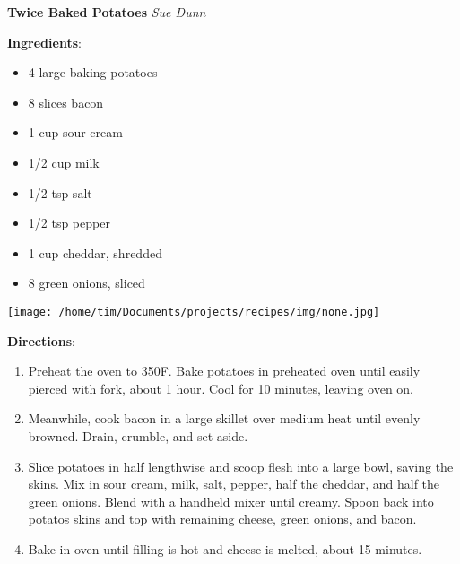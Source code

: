 \documentclass[11pt, twoside, openany]{book}
\begin{document}
\noindent\begin{minipage}[t]{\linewidth}%
{\Large\textbf{Twice Baked Potatoes}} \label{twice-baked-potatoes}\hfill\textit{Sue Dunn}\\
\noindent\begin{minipage}[t]{0.78\linewidth}%
\textbf{Ingredients}:\vspace{-3mm}
\begin{multicols}{2}
\begin{itemize}\setlength\itemsep{-1mm}
\item 4 large baking potatoes
\item 8 slices bacon
\item 1 cup sour cream
\item 1/2 cup milk
\item 1/2 tsp salt
\item 1/2 tsp pepper
\item 1 cup cheddar, shredded
\item 8 green onions, sliced
\end{itemize}
\end{multicols}
\end{minipage}
\noindent\begin{minipage}[t]{0.18\linewidth}
\centering \strut\vspace*{-\baselineskip}\newline
\texttt{[image: /home/tim/Documents/projects/recipes/img/none.jpg]}\\
\end{minipage}\vspace{3mm}
\textbf{Directions}:
\vspace{-3mm}\begin{enumerate}\setlength\itemsep{-1mm}
\item Preheat the oven to 350F. Bake potatoes in preheated oven until easily pierced with fork, about 1 hour. Cool for 10 minutes, leaving oven on.
\item Meanwhile, cook bacon in a large skillet over medium heat until evenly browned. Drain, crumble, and set aside.
\item Slice potatoes in half lengthwise and scoop flesh into a large bowl, saving the skins. Mix in sour cream, milk, salt, pepper, half the cheddar, and half the green onions. Blend with a handheld mixer until creamy. Spoon back into potatos skins and top with remaining cheese, green onions, and bacon.
\item Bake in oven until filling is hot and cheese is melted, about 15 minutes.
\end{enumerate}
\end{minipage}\vspace{8mm}
\end{document}
